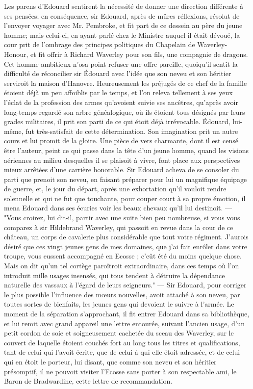 Les parens d’Edouard sentirent la nécessité de donner une direction différente à ses pensées; en conséquence, sir Edouard, après de mûres réflexions, résolut de l’envoyer\setcounter{page}{539} voyager avec Mr. Pembroke, et fit part de ce dessein au père du jeune homme; mais celui-ci, en ayant parlé chez le Ministre auquel il était dévoué, la cour prit de l'ombrage des principes politiques du Chapelain de Waverley-Honour, et fit offrir à Richard Waverley pour son fils, une compagnie de dragons. Cet homme ambitieux n'osa point refuser une offre pareille, quoiqu'il sentît la difficulté de réconcilier sir Édouard avec l'idée que son neveu et son héritier serviroit la maison d'Hanovre. Heureusement les préjugés de ce chef de la famille étoient déjà un peu affoiblis par le temps, et l'on releva tellement à ses yeux l'éclat de la profession des armes qu'avoient suivie ses ancêtres, qu'après avoir long-temps regardé son arbre généalogique, où ils étoient tous désignés par leurs grades militaires, il prit son parti de ce qui étoit déjà irrévocable.
Édouard, lui-même, fut très-satisfait de cette détermination. Son imagination prit un autre cours et lui promit de la gloire. Une pièce de vers charmante, dont il est censé être l'auteur, peint ce qui passe dans la tête d'un jeune homme, quand les visions aériennes au milieu desquelles il se plaisoit à vivre, font place aux perspectives mieux arrêtées d'une carrière honorable.\setcounter{page}{540} Sir Edouard acheva de se consoler du parti que prenoit son neveu, en faisant préparer pour lui un magnifique équipage de guerre, et, le jour du départ, après une exhortation qu'il vouloit rendre solennelle et qui ne fut que touchante, pour couper court à sa propre émotion, il mena Edouard dans ses écuries voir les beaux chevaux qu'il lui destinoit. — "Vous croirez, lui dit-il, partir avec une suite bien peu nombreuse, si vous vous comparez à sir Hildebrand Waverley, qui passoit en revue dans la cour de ce château, un corps de cavalerie plus considérable que tout votre régiment. J'aurois désiré que ces vingt jeunes gens de mes domaines, que j'ai fait enrôler dans votre troupe, vous eussent accompagné en Ecosse ; c'eût été du moins quelque chose. Mais on dit qu'un tel cortège paroîtroit extraordinaire, dans ces temps où l'on introduit mille usages insensés, qui tous tendent à détruire la dépendance naturelle des vassaux à l'égard de leurs seigneurs." — Sir Edouard, pour corriger le plus possible l'influence des mœurs nouvelles, avoit attaché à son neveu, par toutes sortes de bienfaits, les jeunes gens qui devoient le suivre à l'armée. Le moment de la séparation s'approchant, il fit entrer Edouard\setcounter{page}{541} dans sa bibliothèque, et lui remit avec grand appareil une lettre entourée, suivant l'ancien usage, d'un petit cordon de soie et soigneusement cachetée du sceau des Waverley, sur le couvert de laquelle étoient couchés fort au long tous les titres et qualifications, tant de celui qui l'avoit écrite, que de celui à qui elle étoit adressée, et de celui qui en étoit le porteur, lui disant, que comme son neveu et son héritier présomptif, il ne pouvoit visiter l'Ecosse sans porter à son respectable ami, le Baron de Bradwardine, cette lettre de recommandation.
